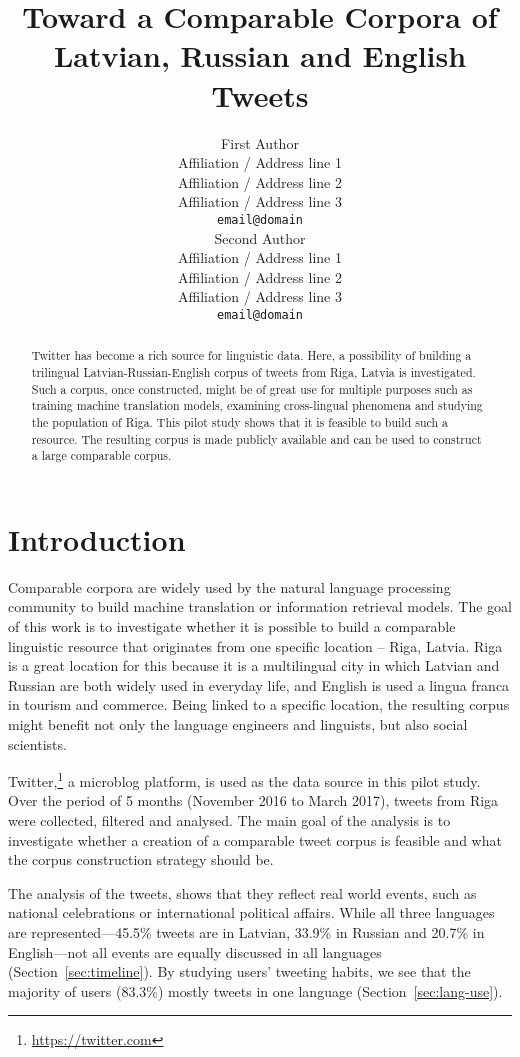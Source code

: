 \documentclass[11pt,a4paper]{article}
\title{Toward a Comparable Corpora of Latvian, Russian and English Tweets}
\author{First Author \\
  Affiliation / Address line 1 \\
  Affiliation / Address line 2 \\
  Affiliation / Address line 3 \\
  {\tt email@domain} \\\And
  Second Author \\
  Affiliation / Address line 1 \\
  Affiliation / Address line 2 \\
  Affiliation / Address line 3 \\
  {\tt email@domain} \\}
\date{}
\begin{document}
\maketitle

\begin{abstract}
Twitter has become a rich source for linguistic data. Here, a possibility of building a trilingual Latvian-Russian-English corpus of tweets from Riga, Latvia is investigated. Such a corpus, once constructed, might be of great use for multiple purposes such as training machine translation models, examining cross-lingual phenomena and studying the population of Riga. This pilot study shows that it is feasible to build such a resource. The resulting corpus is made publicly available and can be used to construct a large comparable corpus.
\end{abstract}

\section{Introduction}
\label{sec:introduction}

Comparable corpora are widely used by the natural language processing community to build machine translation or information retrieval models. The goal of this work is to investigate whether it is possible to build a comparable linguistic resource that originates from one specific location -- Riga, Latvia. Riga is a great location for this because it is a multilingual city in which Latvian and Russian are both widely used in everyday life, and English is used a lingua franca in tourism and commerce. Being linked to a specific location, the resulting corpus might benefit not only the language engineers and linguists, but also social scientists.

Twitter,\footnote{\url{https://twitter.com}} a microblog platform, is used as the data source in this pilot study. Over the period of 5 months (November 2016 to March 2017), tweets from Riga were collected, filtered and analysed. The main goal of the analysis is to investigate whether a creation of a comparable tweet corpus is feasible and what the corpus construction strategy should be.

The analysis of the tweets, shows that they reflect real world events, such as national celebrations or international political affairs. While all three languages are represented---45.5\% tweets are in Latvian, 33.9\% in Russian and 20.7\% in English---not all events are equally discussed in all languages (Section~\ref{sec:timeline}). By studying users' tweeting habits, we see that the majority of users (83.3\%) mostly tweets in one language (Section~\ref{sec:lang-use}).
\end{document}
